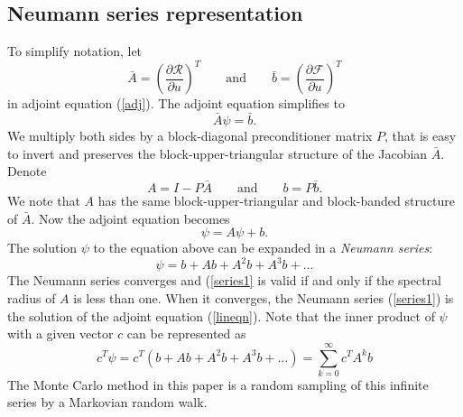 \documentclass{elsart}
\theoremstyle{remark}
\theoremstyle{definition}
\theoremstyle{proof}
\begin{document}
    \subsection{Neumann series representation}
        To simplify notation, let
        \[ \bar{A} = \left( \frac{\partial \mathcal{R}}{\partial u} \right)^T
            \qquad \mbox{and} \qquad
            \bar{b} = \left( \frac{\partial \mathcal{F}}{\partial u} \right)^T
        \]
        in adjoint equation (\ref{adj}).  The adjoint equation simplifies to
        \[ \bar{A} \psi = \bar{b} . \] We multiply both sides by a
        block-diagonal preconditioner matrix $P$, that is easy to invert
        and preserves the block-upper-triangular structure of the Jacobian
        $\bar{A}$. Denote
        \begin{equation}
            A = I - P \bar{A} \qquad \mbox{and} \qquad b = P \bar{b} .
            \label{precond}
        \end{equation}
        We note that $A$ has the same block-upper-triangular and block-banded
        structure of $\bar{A}$.  Now the adjoint equation becomes
        \begin{equation}
            \psi = A \psi + b .
            \label{lineqn}
        \end{equation}
        The solution $\psi$ to the equation above can be expanded in a
        \emph{Neumann series}:
        \begin{equation}
            \psi = b + A b + A^2 b + A^3 b + \ldots
            \label{series1}
        \end{equation}
        The Neumann series converges and (\ref{series1} is valid if and only
        if the spectral radius of $A$ is less than one. When it converges,
        the Neumann series (\ref{series1}) is the solution of the adjoint
        equation (\ref{lineqn}). Note that the inner product of $\psi$
        with a given vector $c$ can be represented as
        \begin{equation}
            c^T \psi = c^T ( b + A b + A^2 b + A^3 b + \ldots )
                     = \sum_{k=0}^\infty c^T A^k b
            \label{series}
        \end{equation}
        The Monte Carlo method in this paper is a random sampling of this
        infinite series by a Markovian random walk.
    
\end{document}
